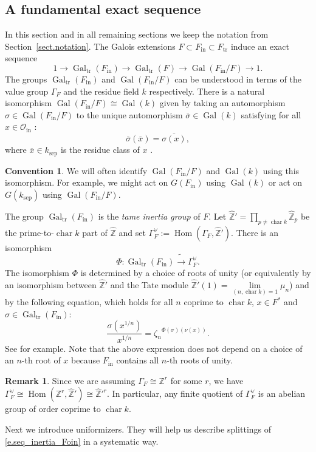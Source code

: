 \documentclass[12pt]{amsart}
\numberwithin{equation}{section}
\theoremstyle{definition}
\newtheorem{remark}[theorem]{Remark}
\newtheorem{convention}[theorem]{Convention}
\newcommand{\cO}{\mathcal{O}}
\newcommand{\bZ}{\mathbb{Z}}
\newcommand{\Gal}{\operatorname{Gal}}
\newcommand{\Hom}{\operatorname{Hom}}
\newcommand{\sep}{\operatorname{sep}}
\newcommand{\Char}{\operatorname{char}}
\newcommand{\tr}{\operatorname{tr}}
\newcommand{\ksep}{k_{\sep}}
\newcommand{\Ftr}{F_{\tr}}
\newcommand{\oin}{\operatorname{in}}
\newcommand{\Oin}{\cO_{\oin}}
\newcommand{\Fin}{F_{\oin}}
\newcommand{\Galtr}{\Gal_{\tr}}
\newcommand{\I}[1]{\Gamma_{#1}^{\vee}}
\begin{document}
\subsection{A fundamental exact sequence} In this section and in all remaining sections we keep the notation from Section~\ref{sect.notation}.
The Galois extensions $F\subset \Fin\subset \Ftr$ induce an exact sequence
\begin{equation}\label{e.seq_inertia_Foin}
    1\to \Galtr(F_{\oin}) \to \Galtr(F) \to \Gal(\Fin/F)\to 1.
\end{equation}
The groups $\Galtr(\Fin)$ and $\Gal(\Fin/F)$ can be understood in terms of the value group $\Gamma_F$ and the residue field $k$ respectively. 
There is a natural isomorphism $\Gal(\Fin/F) \cong \Gal(k)$ given by taking an automorphism $\sigma\in \Gal(\Fin/F)$ to the unique automorphism $\overline{\sigma}\in \Gal(k)$ satisfying  for all  $x\in \Oin$ :
\begin{equation}\label{e.residue_Gal_iso}
\overline{\sigma}(\overline{x}) = \overline{\sigma(x)},
\end{equation}
where $\overline{x}\in \ksep$ is the residue class of $x$ \cite[Theorems A.23]{tignol2015value}. 
\begin{convention}\label{rem.Fin}
    We will often identify $\Gal(\Fin/F)$ and $\Gal(k)$ using this isomorphism. For example, we might act on $G(\Fin)$ using $\Gal(k)$ or act on $G(\ksep)$ using $\Gal(\Fin/F)$.
\end{convention}
The group $\Galtr(F_{\oin})$ is the \emph{tame inertia group} of $F$. Let $ \hat{\bZ}' = \prod_{p\neq \Char k} \hat{\bZ}_p$ be the prime-to-$\Char k$ part of $\hat{\bZ}$ and set $\I{F}:= \Hom(\Gamma_F,\hat{\bZ}')$. There is an  isomorphism
\begin{equation}\label{e.inertia_iso}
    \Phi: \Galtr(F_{\oin}) \tilde{\to} \I{F}.
\end{equation}
The isomorphism $\Phi$ is determined by a choice of roots of unity (or equivalently by an isomorphism between $\hat{\bZ}'$ and the Tate module $\hat{\bZ}'(1) =\underset{(n,\Char k)= 1}{\lim} \mu_n$) and     by the following equation, which holds for all $n$ coprime to $\Char k$, $x\in F^*$ and $\sigma\in \Galtr(\Fin)$:
\begin{equation}\label{e.10}
    {\frac{\sigma(x^{1/n})}{x^{1/n}}} = {\zeta_n}^{\Phi(\sigma)(\nu(x))}.
\end{equation} 
See \cite[Theorem A.24]{tignol2015value} for example. Note that the above expression does not depend on a choice of an $n$-th root of $x$ because $\Fin$ contains all $n$-th roots of unity.
\begin{remark}\label{rem.quotients_tame_inertia}
    Since we are assuming $\Gamma_{F}\cong \bZ^r$ for some $r$, we have $\I{F} \cong \Hom(\bZ^r,\hat{\bZ}') \cong \hat{\bZ}'^r$. In particular, any finite quotient of $\I{F}$ is an abelian group of order coprime to $\Char k$.
\end{remark}
 Next we introduce uniformizers. They will help us describe splittings of \eqref{e.seq_inertia_Foin} in a systematic way.
\end{document}
